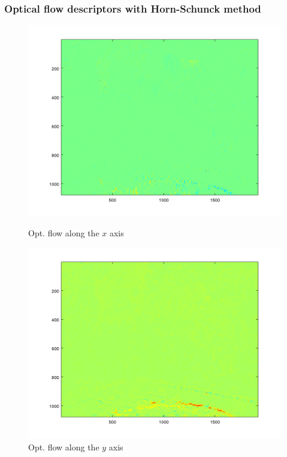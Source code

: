 \documentclass[french]{beamer}
\begin{document}
	\begin{frame}
		\frametitle{Optical flow descriptors with Horn-Schunck method}
		
		\begin{figure}[h]
			\begin{minipage}[b]{.49\linewidth}
				\includegraphics[width=1.0\textwidth]{ofx.png}
				\caption{Opt. flow along the $x$ axis}
			\end{minipage}
			\hfill
			\begin{minipage}[b]{0.49\linewidth}
				\includegraphics[width=1.0\textwidth]{ofy.png}
				\caption{Opt. flow along the $y$ axis}
			\end{minipage}
			\label{fig:f}
		\end{figure}
		
	\end{frame}
	
\end{document}
